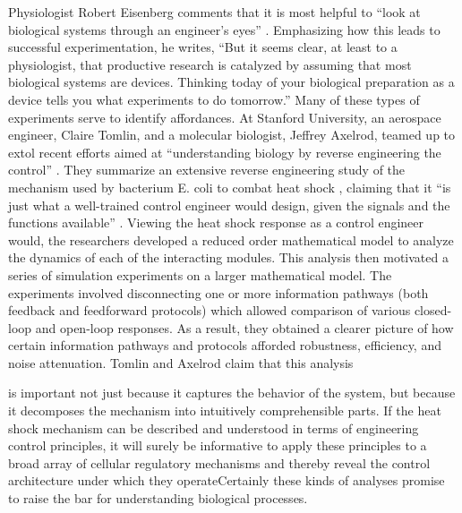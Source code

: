 Physiologist Robert Eisenberg comments that it is most helpful to “look
at biological systems through an engineer’s eyes” \citep[][p.~376]{eisenberg2007}.
Emphasizing how this leads to successful experimentation, he writes,
“But it seems clear, at least to a physiologist, that productive
research is catalyzed by assuming that most biological systems are
devices. Thinking today of your biological preparation as a device
tells you what experiments to do tomorrow.” Many of these types of
experiments serve to identify affordances. At Stanford University, an
aerospace engineer, Claire Tomlin, and a molecular biologist, Jeffrey
Axelrod, teamed up to extol recent efforts aimed at
``understanding biology by reverse engineering the
control'' \citep[][pp. 4219--4220]{tomlinaxelrod2005}. They summarize an extensive reverse
engineering study of the mechanism used by bacterium E. coli to combat
heat shock , claiming that it “is just what a
well-trained control engineer would design, given the signals and the
functions available” \citep[][4219]{tomlinaxelrod2005}. Viewing the heat shock response as a control
engineer would, the researchers developed a reduced order mathematical
model to analyze the dynamics of each of the interacting modules. This
analysis then motivated a series of simulation experiments on a larger
mathematical model. The experiments involved disconnecting one or more
information pathways (both feedback and feedforward protocols) which
allowed comparison of various closed-loop and open-loop responses. As a
result, they obtained a clearer picture of how certain information
pathways and protocols afforded robustness, efficiency, and noise
attenuation. Tomlin and Axelrod claim that this analysis 

\begin{quoting}
is important
not just because it captures the behavior of the system, but because it
decomposes the mechanism into intuitively comprehensible parts. If the
heat shock mechanism can be described and understood in terms of
engineering control principles, it will surely be informative to apply
these principles to a broad array of cellular regulatory mechanisms and
thereby reveal the control architecture under which they
operate{\jdots}Certainly these kinds of analyses promise to raise the bar for
understanding biological processes. \citep[][p.~4220]{tomlinaxelrod2005}
\end{quoting}


